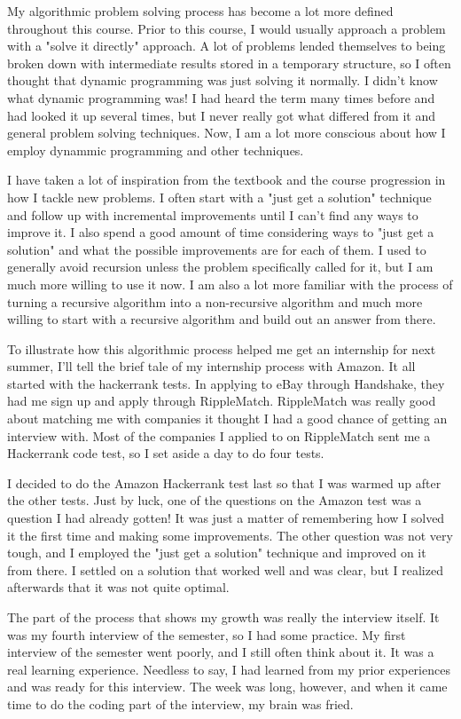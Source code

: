 \documentclass{article}
\begin{document}
My algorithmic problem solving process has become a lot more defined throughout this course. Prior to this course, I would usually approach a problem with a "solve it directly" approach. A lot of problems lended themselves to being broken down with intermediate results stored in a temporary structure, so I often thought that dynamic programming was just solving it normally. I didn't know what dynamic programming was! I had heard the term many times before and had looked it up several times, but I never really got what differed from it and general problem solving techniques. Now, I am a lot more conscious about how I employ dynammic programming and other techniques.

I have taken a lot of inspiration from the textbook and the course progression in how I tackle new problems. I often start with a "just get a solution" technique and follow up with incremental improvements until I can't find any ways to improve it. I also spend a good amount of time considering ways to "just get a solution" and what the possible improvements are for each of them. I used to generally avoid recursion unless the problem specifically called for it, but I am much more willing to use it now. I am also a lot more familiar with the process of turning a recursive algorithm into a non-recursive algorithm and much more willing to start with a recursive algorithm and build out an answer from there.

To illustrate how this algorithmic process helped me get an internship for next summer, I'll tell the brief tale of my internship process with Amazon. It all started with the hackerrank tests. In applying to eBay through Handshake, they had me sign up and apply through RippleMatch. RippleMatch was really good about matching me with companies it thought I had a good chance of getting an interview with. Most of the companies I applied to on RippleMatch sent me a Hackerrank code test, so I set aside a day to do four tests.

I decided to do the Amazon Hackerrank test last so that I was warmed up after the other tests. Just by luck, one of the questions on the Amazon test was a question I had already gotten! It was just a matter of remembering how I solved it the first time and making some improvements. The other question was not very tough, and I employed the "just get a solution" technique and improved on it from there. I settled on a solution that worked well and was clear, but I realized afterwards that it was not quite optimal.

The part of the process that shows my growth was really the interview itself. It was my fourth interview of the semester, so I had some practice. My first interview of the semester went poorly, and I still often think about it. It was a real learning experience. Needless to say, I had learned from my prior experiences and was ready for this interview. The week was long, however, and when it came time to do the coding part of the interview, my brain was fried.
\end{document}
